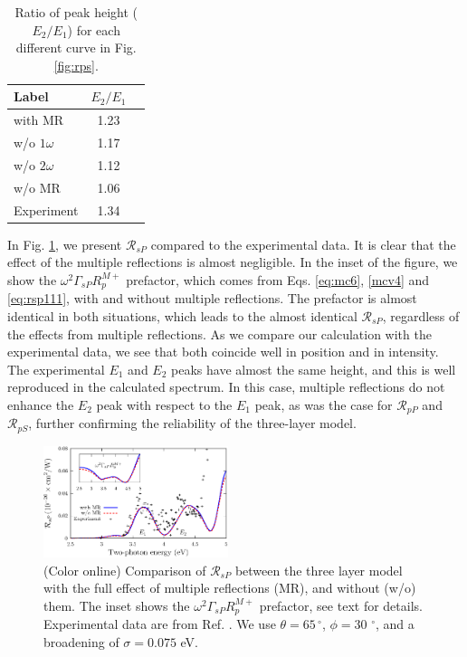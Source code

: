 \documentclass[aps,prb,10pt,showpacs,letterpaper,twocolumn]{revtex4-1}
\begin{document}
\begin{table}[t]
{\color{red}
\caption{Ratio of peak height ($E_{2}/E_{1}$) for each different curve in
Fig. \ref{fig:rps}.}
\label{tab:rpsintensity}
\centering
\begin{tabular}{ | l | c | c | }
\hline
Label           &   $E_{2}/E_{1}$ \\
\hline
with MR         &   1.23          \\
w/o $1\omega$   &   1.17          \\
w/o $2\omega$   &   1.12          \\
w/o MR          &   1.06          \\
Experiment      &   1.34          \\
\hline
\end{tabular}
}
\end{table}

In Fig. \ref{fig:rsp}, we present $\mathcal{R}_{sP}$ compared to the
experimental data. It is clear that the effect of the multiple reflections is
almost negligible. In the inset of the figure, we show the
$\omega^{2}\Gamma_{sP}R^{M+}_{p}$ prefactor, which comes from Eqs.
\eqref{eq:mc6}, \eqref{mcv4} and \eqref{eq:rsp111}, with and without multiple
reflections. The prefactor is almost identical in both situations, which leads
to the almost identical ${\mathcal R}_{sP}$, regardless of the effects from
multiple reflections. As we compare our calculation with the experimental data,
we see that both coincide well in position and in intensity. The experimental
$E_{1}$ and $E_{2}$ peaks have almost the same height, and this is well
reproduced in the calculated spectrum. In this case, multiple reflections do not
enhance the $E_{2}$ peak with respect to the $E_{1}$ peak, as was the case for
$\mathcal{R}_{pP}$ and $\mathcal{R}_{pS}$, further confirming the reliability of
the three-layer model.

\begin{figure}[b]
\includegraphics[width=0.48\textwidth]{figures/fig5}
\caption{(Color online) Comparison of ${\mathcal R}_{sP}$ between the three
layer model with the full effect of multiple reflections (MR), and without (w/o)
them. The inset shows the $\omega^2\Gamma_{sP} R^{M+}_{p}$ prefactor, see text
for details. Experimental data are from Ref. . We use
$\theta = 65\,^{\circ}$, $\phi = 30\,\,^{\circ}$, and a broadening of $\sigma =
0.075$ eV.}
\label{fig:rsp}
\end{figure}
\end{document}

